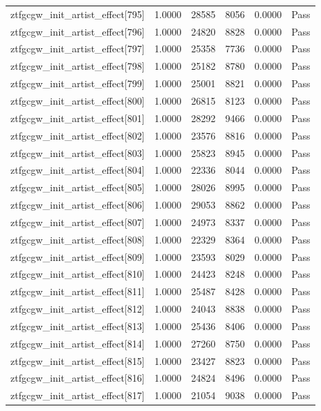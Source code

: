 \begin{table}[htbp]
\begin{tabular}{llrrll}
ztfgcgw\_init\_artist\_effect[795] & 1.0000 & 28585 & 8056 & 0.0000 & Pass \\
ztfgcgw\_init\_artist\_effect[796] & 1.0000 & 24820 & 8828 & 0.0000 & Pass \\
ztfgcgw\_init\_artist\_effect[797] & 1.0000 & 25358 & 7736 & 0.0000 & Pass \\
ztfgcgw\_init\_artist\_effect[798] & 1.0000 & 25182 & 8780 & 0.0000 & Pass \\
ztfgcgw\_init\_artist\_effect[799] & 1.0000 & 25001 & 8821 & 0.0000 & Pass \\
ztfgcgw\_init\_artist\_effect[800] & 1.0000 & 26815 & 8123 & 0.0000 & Pass \\
ztfgcgw\_init\_artist\_effect[801] & 1.0000 & 28292 & 9466 & 0.0000 & Pass \\
ztfgcgw\_init\_artist\_effect[802] & 1.0000 & 23576 & 8816 & 0.0000 & Pass \\
ztfgcgw\_init\_artist\_effect[803] & 1.0000 & 25823 & 8945 & 0.0000 & Pass \\
ztfgcgw\_init\_artist\_effect[804] & 1.0000 & 22336 & 8044 & 0.0000 & Pass \\
ztfgcgw\_init\_artist\_effect[805] & 1.0000 & 28026 & 8995 & 0.0000 & Pass \\
ztfgcgw\_init\_artist\_effect[806] & 1.0000 & 29053 & 8862 & 0.0000 & Pass \\
ztfgcgw\_init\_artist\_effect[807] & 1.0000 & 24973 & 8337 & 0.0000 & Pass \\
ztfgcgw\_init\_artist\_effect[808] & 1.0000 & 22329 & 8364 & 0.0000 & Pass \\
ztfgcgw\_init\_artist\_effect[809] & 1.0000 & 23593 & 8029 & 0.0000 & Pass \\
ztfgcgw\_init\_artist\_effect[810] & 1.0000 & 24423 & 8248 & 0.0000 & Pass \\
ztfgcgw\_init\_artist\_effect[811] & 1.0000 & 25487 & 8428 & 0.0000 & Pass \\
ztfgcgw\_init\_artist\_effect[812] & 1.0000 & 24043 & 8838 & 0.0000 & Pass \\
ztfgcgw\_init\_artist\_effect[813] & 1.0000 & 25436 & 8406 & 0.0000 & Pass \\
ztfgcgw\_init\_artist\_effect[814] & 1.0000 & 27260 & 8750 & 0.0000 & Pass \\
ztfgcgw\_init\_artist\_effect[815] & 1.0000 & 23427 & 8823 & 0.0000 & Pass \\
ztfgcgw\_init\_artist\_effect[816] & 1.0000 & 24824 & 8496 & 0.0000 & Pass \\
ztfgcgw\_init\_artist\_effect[817] & 1.0000 & 21054 & 9038 & 0.0000 & Pass \\

\end{tabular}
\end{table}
